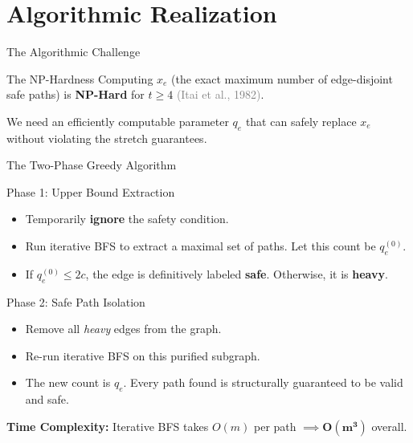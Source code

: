 \documentclass[10pt]{beamer}
\begin{document}
\section{Algorithmic Realization}

\begin{frame}{The Algorithmic Challenge}
    \begin{alertblock}{The NP-Hardness}
        Computing $x_e$ (the exact maximum number of edge-disjoint safe paths) is \textbf{NP-Hard} for $t \ge 4$ \textcolor{gray}{\small (Itai et al., 1982)}.
    \end{alertblock}
    \vspace{1cm}
    We need an efficiently computable parameter $q_e$ that can safely replace $x_e$ without violating the stretch guarantees.
\end{frame}

\begin{frame}{The Two-Phase Greedy Algorithm}    
    \begin{block}{Phase 1: Upper Bound Extraction}
        \begin{itemize}
            \item Temporarily \textbf{ignore} the safety condition.
            \item Run iterative BFS to extract a maximal set of paths. Let this count be $q_e^{(0)}$.
            \item If $q_e^{(0)} \le 2c$, the edge is definitively labeled \textbf{safe}. Otherwise, it is \textbf{heavy}.
        \end{itemize}
    \end{block}

    \vspace{0.3cm}
    \begin{block}{Phase 2: Safe Path Isolation}
        \begin{itemize}
            \item Remove all \textit{heavy} edges from the graph.
            \item Re-run iterative BFS on this purified subgraph.
            \item The new count is $q_e$. Every path found is structurally guaranteed to be valid and safe.
        \end{itemize}
    \end{block}
    
    \vspace{0.2cm}
    \textbf{Time Complexity:} Iterative BFS takes $O(m)$ per path $\implies \mathbf{O(m^3)}$ overall.
\end{frame}
\end{document}
